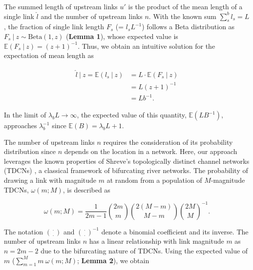 \documentclass[11pt, class=article, crop=false]{standalone}
\begin{document}
The summed length of upstream links $u'$ is the product of the mean length of a single link $\hat{l}$ and the number of upstream links $n$.
With the known sum $\sum_s^b l_s = L$, the fraction of single link length $F_s$ (= $l_s L^{-1}$) follows a Beta distribution as $F_s ~|~ z \sim \mbox{Beta}(1, z)$ (\textbf{Lemma 1}), whose expected value is $\mathbb{E}(F_s~|~z) = (z + 1)^{-1}$.
Thus, we obtain an intuitive solution for the expectation of mean length as

\begin{align}
    \begin{split}
    \hat{l}~|~z = \mathbb{E}(l_s~|~z) &= L \cdot \mathbb{E}(F_s~|~z)\\
                                      &= L(z + 1)^{-1}\\
                                      &= Lb^{-1}.
    \end{split}
\end{align}

In the limit of $\lambda_b L \rightarrow \infty$, the expected value of this quantity, $\mathbb{E}(LB^{-1})$, approaches $\lambda_b^{-1}$ since $\mathbb{E}(B) = \lambda_b L + 1$.

The number of upstream links $n$ requires the consideration of its probability distribution since $n$ depends on the location in a network.
Here, our approach leverages the known properties of Shreve's topologically distinct channel networks (TDCNs) \citep{shreve_infinite_1967}, a classical framework of bifurcating river networks.
The probability of drawing a link with magnitude $m$ at random from a population of $M$-magnitude TDCNs, $\omega(m; M)$, is described as

\begin{equation}
    \omega(m; M) = \frac{1}{2m - 1} \binom{2m}{m} \binom{2(M - m)}{M - m} \binom{2M}{M}^{-1}.
\end{equation}

The notation $\binom{\cdot}{\cdot}$ and $\binom{\cdot}{\cdot}^{-1}$ denote a binomial coefficient and its inverse.
The number of upstream links $n$ has a linear relationship with link magnitude $m$ as $n = 2m - 2$ due to the bifurcating nature of TDCNs.
Using the expected value of $m$ ($\sum_{m=1}^{M} m~\omega(m; M)$; \textbf{Lemma 2}), we obtain
\end{document}

